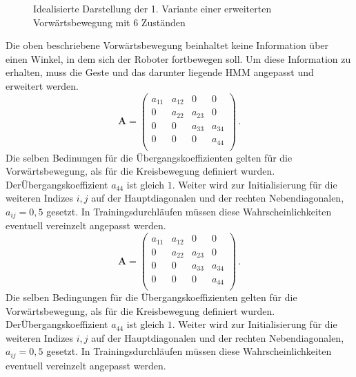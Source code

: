 \begin{figure}[htb]
{
\label{fig:forward_second_sub}
}
\caption{Idealisierte Darstellung der 1. Variante einer erweiterten Vorw\"artsbewegung mit 6 Zust\"anden}
    \label{fig:Forward_ideal_var1}
\end{figure}

Die oben beschriebene Vorw\"artsbewegung beinhaltet keine Information \"uber einen Winkel, in dem sich der Roboter fortbewegen soll. Um diese Information zu erhalten, muss die Geste und das darunter liegende \acrshort{HMM} angepasst und erweitert werden.
\newline
\begin{equation}
\mathbf{A} = 
\begin{pmatrix}
a_{11} & a_{12} & 0 & 0\\
0 & a_{22} & a_{23} & 0\\
0 & 0 & a_{33} & a_{34}\\
0 & 0 & 0 & a_{44} \\
\end{pmatrix} \, .
\end{equation}
Die selben Bedinungen f\"ur die \"Ubergangskoeffizienten gelten f\"ur die Vorw\"artsbewegung, als f\"ur die Kreisbewegung definiert wurden. 
\newline
Der\"Ubergangskoeffizient $a_{44}$ ist gleich $1$. Weiter wird zur Initialisierung f\"ur die weiteren Indizes $i, j$ auf der Hauptdiagonalen und der rechten Nebendiagonalen, $a_{ij} = 0,5$ gesetzt. In Trainingsdurchl\"aufen m\"ussen diese Wahrscheinlichkeiten eventuell vereinzelt angepasst werden.\begin{equation}
\mathbf{A} = 
\begin{pmatrix}
a_{11} & a_{12} & 0 & 0\\
0 & a_{22} & a_{23} & 0\\
0 & 0 & a_{33} & a_{34}\\
0 & 0 & 0 & a_{44} \\
\end{pmatrix} \, .
\end{equation}
Die selben Bedingungen f\"ur die \"Ubergangskoeffizienten gelten f\"ur die Vorw\"artsbewegung, als f\"ur die Kreisbewegung definiert wurden. 
\newline
Der\"Ubergangskoeffizient $a_{44}$ ist gleich $1$. Weiter wird zur Initialisierung f\"ur die weiteren Indizes $i, j$ auf der Hauptdiagonalen und der rechten Nebendiagonalen, $a_{ij} = 0,5$ gesetzt. In Trainingsdurchl\"aufen m\"ussen diese Wahrscheinlichkeiten eventuell vereinzelt angepasst werden.

